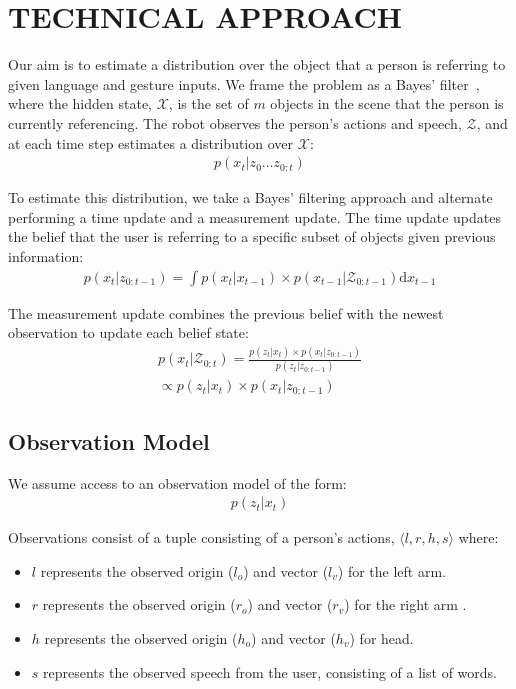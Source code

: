 \documentclass[letterpaper, 10 pt, conference]{ieeeconf}
\begin{document}
\section{TECHNICAL APPROACH}

Our aim is to estimate a distribution over the object that a person is
referring to given language and gesture inputs.  We frame the problem
as a Bayes' filter~\citep{thrun08}, where the hidden state,
$\mathcal{X}$, is the set of $m$ objects in the scene that the person
is currently referencing. The robot observes the person's actions and
speech, $\mathcal{Z}$, and at each time step estimates a distribution
over $\mathcal{X}$:
\begin{align}
  p(x_t | z_0 \dots z_{0:t})
\end{align}


To estimate this distribution, we take a Bayes' filtering approach and
alternate performing a time update and a measurement update.  The time
update updates the belief that the user is referring to a specific
subset of objects given previous information:
\begin{align}
p(x_t | z_{0:t-1}) = \int p(x_t|x_{t-1})\times p(x_{t-1} | \mathcal{Z}_{0:t-1}) \text{d}x_{t-1}
\end{align}

The measurement update combines the previous belief with the newest observation to update each belief state: 
\begin{align}
p(x_t | \mathcal{Z}_{0:t}) = \frac{p(z_t | x_t) \times p(x_t | z_{0:t-1})}{p(z_t | z_{0:t-1})} \\\propto p(z_t | x_t) \times p(x_t | z_{0:t-1})
\end{align}





\subsection{Observation Model}

We assume access to an observation model of the form:
\begin{align}
p(z_t | x_t)
\end{align}

Observations consist of a tuple consisting of a person's actions,
$\langle l, r, h, s\rangle $ where:
\begin{itemize}
	\item $l$ represents the observed origin ($l_o$) and vector ($l_v$) for the left arm.
	\item $r$ represents the observed origin  ($r_o$) and vector ($r_v$)  for the right arm .
	\item $h$ represents the observed origin  ($h_o$) and vector ($h_v$)  for head.
	\item $s$ represents the observed speech from the user, consisting of a list of words.
	\end{itemize}
\end{document}
